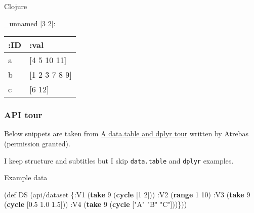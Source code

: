 \documentclass[]{article}
\newenvironment{Shaded}{\begin{snugshade}}{\end{snugshade}}
\newcommand{\KeywordTok}[1]{\textcolor[rgb]{0.13,0.29,0.53}{\textbf{#1}}}
\newcommand{\DecValTok}[1]{\textcolor[rgb]{0.00,0.00,0.81}{#1}}
\newcommand{\FloatTok}[1]{\textcolor[rgb]{0.00,0.00,0.81}{#1}}
\newcommand{\StringTok}[1]{\textcolor[rgb]{0.31,0.60,0.02}{#1}}
\newcommand{\FunctionTok}[1]{\textcolor[rgb]{0.00,0.00,0.00}{#1}}
\newcommand{\BuiltInTok}[1]{#1}
\newcommand{\AttributeTok}[1]{\textcolor[rgb]{0.77,0.63,0.00}{#1}}
\newcommand{\NormalTok}[1]{#1}
\begin{document}
Clojure

\begin{Shaded}
\end{Shaded}

\_unnamed {[}3 2{]}:

\begin{longtable}[]{@{}ll@{}}
\toprule
:ID & :val\tabularnewline
\midrule
\endhead
a & {[}4 5 10 11{]}\tabularnewline
b & {[}1 2 3 7 8 9{]}\tabularnewline
c & {[}6 12{]}\tabularnewline
\bottomrule
\end{longtable}

\subsubsection{API tour}\label{api-tour}

Below snippets are taken from
\href{https://atrebas.github.io/post/2019-03-03-datatable-dplyr/}{A
data.table and dplyr tour} written by Atrebas (permission granted).

I keep structure and subtitles but I skip \texttt{data.table} and
\texttt{dplyr} examples.

Example data

\begin{Shaded}
\begin{Highlighting}[]
\NormalTok{(}\BuiltInTok{def}\FunctionTok{ DS }\NormalTok{(api/dataset \{}\AttributeTok{:V1}\NormalTok{ (}\KeywordTok{take} \DecValTok{9}\NormalTok{ (}\KeywordTok{cycle}\NormalTok{ [}\DecValTok{1} \DecValTok{2}\NormalTok{]))}
                      \AttributeTok{:V2}\NormalTok{ (}\KeywordTok{range} \DecValTok{1} \DecValTok{10}\NormalTok{)}
                      \AttributeTok{:V3}\NormalTok{ (}\KeywordTok{take} \DecValTok{9}\NormalTok{ (}\KeywordTok{cycle}\NormalTok{ [}\FloatTok{0.5} \FloatTok{1.0} \FloatTok{1.5}\NormalTok{]))}
                      \AttributeTok{:V4}\NormalTok{ (}\KeywordTok{take} \DecValTok{9}\NormalTok{ (}\KeywordTok{cycle}\NormalTok{ [}\StringTok{"A"} \StringTok{"B"} \StringTok{"C"}\NormalTok{]))\}))}
\end{Highlighting}
\end{Shaded}
\end{document}
